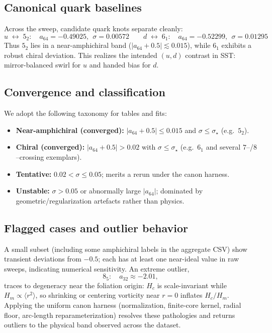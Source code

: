 \documentclass[11pt, preprint,titlepage]{revtex4-2}
\begin{document}
\subsection{Canonical quark baselines}
Across the sweep, candidate quark knots separate cleanly:
\[
\boxed{u\;\leftrightarrow\;5_2:\quad a_{64}=-0.49025,\ \ \sigma=0.00572}
\qquad
\boxed{d\;\leftrightarrow\;6_1:\quad a_{64}=-0.52299,\ \ \sigma=0.01295}
\]
Thus \(5_2\) lies in a near-amphichiral band (\(|a_{64}+0.5|\!\lesssim\!0.015\)), while \(6_1\) exhibits a robust chiral deviation. This realizes the intended \((u,d)\) contrast in SST: mirror-balanced swirl for \(u\) and handed bias for \(d\).

\subsection{Convergence and classification}
We adopt the following taxonomy for tables and fits:
\begin{itemize}
\item \textbf{Near-amphichiral (converged):} \(|a_{64}+0.5|\le 0.015\) and \(\sigma\le\sigma_\star\) (e.g.\ \(5_2\)).
\item \textbf{Chiral (converged):} \(|a_{64}+0.5|>0.02\) with \(\sigma\le\sigma_\star\) (e.g.\ \(6_1\) and several \(7\)–/\(8\)–crossing exemplars).
\item \textbf{Tentative:} \(0.02<\sigma\le 0.05\); merits a rerun under the canon harness.
\item \textbf{Unstable:} \(\sigma>0.05\) or abnormally large \(|a_{64}|\); dominated by geometric/regularization artefacts rather than physics.
\end{itemize}

\subsection{Flagged cases and outlier behavior}
A small subset (including some amphichiral labels in the aggregate CSV) show transient deviations from \(-0.5\); each has at least one near-ideal value in raw sweeps, indicating numerical sensitivity. An extreme outlier,
\[
8_5:\quad a_{32}\approx -2.01,
\]
traces to degeneracy near the foliation origin: \(H_c\) is scale-invariant while \(H_m\propto\langle r^2\rangle\), so shrinking or centering vorticity near \(r=0\) inflates \(H_c/H_m\). Applying the uniform canon harness (normalization, finite-core kernel, radial floor, arc-length reparameterization) resolves these pathologies and returns outliers to the physical band observed across the dataset.
\end{document}

